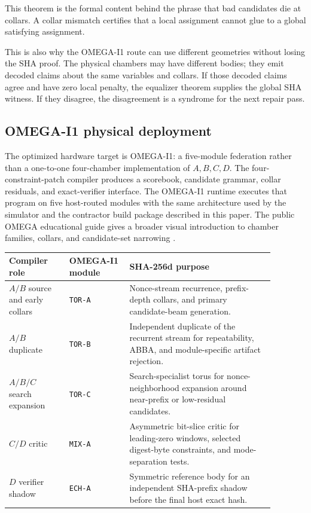 \documentclass[11pt]{article}
\theoremstyle{definition}
\theoremstyle{remark}
\begin{document}
This theorem is the formal content behind the phrase that bad candidates die at
collars. A collar mismatch certifies that a local assignment cannot glue to a
global satisfying assignment.

This is also why the OMEGA-I1 route can use different geometries without losing
the SHA proof. The physical chambers may have different bodies; they emit
decoded claims about the same variables and collars. If those decoded claims
agree and have zero local penalty, the equalizer theorem supplies the global SHA
witness. If they disagree, the disagreement is a syndrome for the next repair
pass.

\subsection{OMEGA-I1 physical deployment}

The optimized hardware target is OMEGA-I1: a five-module federation rather than
a one-to-one four-chamber implementation of \(A,B,C,D\). The four-constraint-patch compiler
produces a scorebook, candidate grammar, collar residuals, and exact-verifier
interface. The OMEGA-I1 runtime executes that program on five host-routed
modules with the
same architecture used by the simulator and the contractor build package
described in this paper.
The public OMEGA educational guide gives a broader visual introduction to
chamber families, collars, and candidate-set narrowing \cite{OmegaEducationalGuide2026}.

\begin{center}
\begin{minipage}{\linewidth}
\centering
\small
\begin{tabular}{L{0.20\linewidth}L{0.20\linewidth}L{0.48\linewidth}}
\toprule
Compiler role & OMEGA-I1 module & SHA-256d purpose\\
\midrule
\(A/B\) source and early collars & \texttt{TOR-A} &
Nonce-stream recurrence, prefix-depth collars, and primary candidate-beam
generation.\\
\(A/B\) duplicate & \texttt{TOR-B} &
Independent duplicate of the recurrent stream for repeatability, ABBA, and
module-specific artifact rejection.\\
\(A/B/C\) search expansion & \texttt{TOR-C} &
Search-specialist torus for nonce-neighborhood expansion around near-prefix
or low-residual candidates.\\
\(C/D\) critic & \texttt{MIX-A} &
Asymmetric bit-slice critic for leading-zero windows, selected digest-byte
constraints, and mode-separation tests.\\
\(D\) verifier shadow & \texttt{ECH-A} &
Symmetric reference body for an independent SHA-prefix shadow before the final
host exact hash.\\
\bottomrule
\end{tabular}
\label{tab:omega-i1-route}
\end{minipage}
\end{center}
\end{document}
